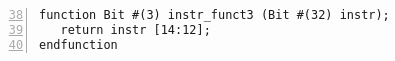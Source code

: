 {\small
\begin{Verbatim}[frame=single, numbers=left, firstnumber=38, label=src\_Common/Instr\_Bits.bsv]
function Bit #(3) instr_funct3 (Bit #(32) instr);
   return instr [14:12];
endfunction
\end{Verbatim}
}
